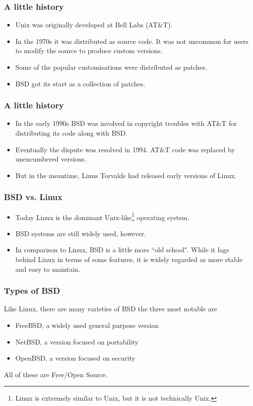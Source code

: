 \documentclass[10pt]{beamer}
\begin{document}
\begin{frame}
  \frametitle{A little history}
  \begin{itemize}
    \item Unix was originally developed at Bell Labs (AT\&T).
    \item In the 1970s it was distributed as source code.  It
          was not uncommon for users to modify the source to produce
          custom versions.
    \item Some of the popular customisations were distributed as patches.
    \item BSD got its start as a collection of patches.
  \end{itemize}  
\end{frame}

\begin{frame}
  \frametitle{A little history}
  \begin{itemize}
    \item In the early 1990s BSD was involved in copyright troubles with
          AT\&T for distributing its code along with BSD.
    \item Eventually the dispute was resolved in 1994.  AT\&T code was
          replaced by unencumbered versions.
    \item But in the meantime, Linus Torvalds had released early versions
          of Linux.
  \end{itemize}  
\end{frame}


\begin{frame}
  \frametitle{BSD vs. Linux}
  \begin{itemize}
    \item Today Linux is the dominant Unix-like\footnote{Linux is extremely similar to Unix, but it is not technically Unix.} operating system.
    \item BSD systems are still widely used, however.
    \item In comparison to Linux, BSD is a little more ``old school".  While
          it lags behind Linux in terms of some features, it is widely 
          regarded as more stable and easy to maintain.
  \end{itemize}  
\end{frame}


\begin{frame}
  \frametitle{Types of BSD}
  Like Linux, there are many varieties of BSD the three most notable are
  \begin{itemize}
    \item FreeBSD, a widely used general purpose version
    \item NetBSD, a version focused on portability
    \item OpenBSD, a version focused on security
  \end{itemize}  

  All of these are Free/Open Source.
\end{frame}
\end{document}
